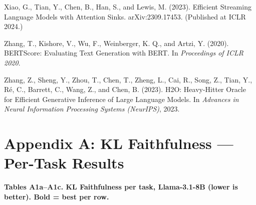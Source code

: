 \documentclass[10pt,letterpaper]{article}
\begin{document}
Xiao, G., Tian, Y., Chen, B., Han, S., and Lewis, M. (2023). Efficient
Streaming Language Models with Attention Sinks. arXiv:2309.17453.
(Published at ICLR 2024.)

Zhang, T., Kishore, V., Wu, F., Weinberger, K. Q., and Artzi, Y. (2020).
BERTScore: Evaluating Text Generation with BERT. In \emph{Proceedings of
ICLR 2020}.

Zhang, Z., Sheng, Y., Zhou, T., Chen, T., Zheng, L., Cai, R., Song, Z.,
Tian, Y., Ré, C., Barrett, C., Wang, Z., and Chen, B. (2023). H2O:
Heavy-Hitter Oracle for Efficient Generative Inference of Large Language
Models. In \emph{Advances in Neural Information Processing Systems
(NeurIPS)}, 2023.


\clearpage
\onecolumn


\hypertarget{appendix-a-kl-faithfulness-per-task-results}{%
\section{Appendix A: KL Faithfulness --- Per-Task
Results}\label{appendix-a-kl-faithfulness-per-task-results}}

\textbf{Tables A1a--A1c. KL Faithfulness per task, Llama-3.1-8B (lower
is better). Bold = best per row.}
\end{document}
